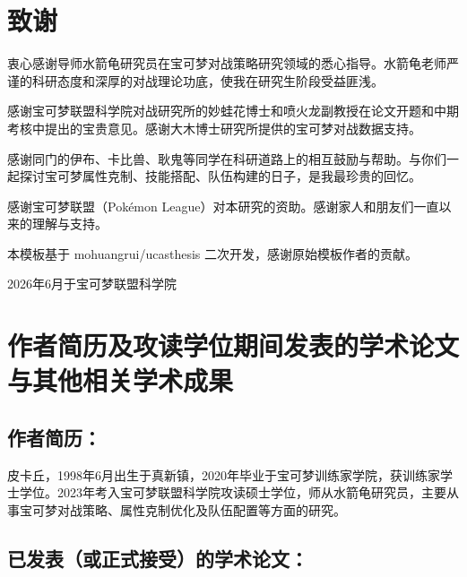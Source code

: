 \chapter[致谢]{致\quad 谢}

衷心感谢导师水箭龟研究员在宝可梦对战策略研究领域的悉心指导。水箭龟老师严谨的科研态度和深厚的对战理论功底，使我在研究生阶段受益匪浅。

感谢宝可梦联盟科学院对战研究所的妙蛙花博士和喷火龙副教授在论文开题和中期考核中提出的宝贵意见。感谢大木博士研究所提供的宝可梦对战数据支持。

感谢同门的伊布、卡比兽、耿鬼等同学在科研道路上的相互鼓励与帮助。与你们一起探讨宝可梦属性克制、技能搭配、队伍构建的日子，是我最珍贵的回忆。

感谢宝可梦联盟（Pokémon League）对本研究的资助。感谢家人和朋友们一直以来的理解与支持。

本模板基于 mohuangrui/ucasthesis 二次开发，感谢原始模板作者的贡献。

\vspace{2cm}
\begin{flushright}
2026年6月于宝可梦联盟科学院
\end{flushright}

\chapter[作者简历及攻读学位期间发表的学术论文与其他相关学术成果]{作者简历及攻读学位期间发表的学术论文与其他相关学术成果}


\section*{作者简历：}

皮卡丘，1998年6月出生于真新镇，2020年毕业于宝可梦训练家学院，获训练家学士学位。2023年考入宝可梦联盟科学院攻读硕士学位，师从水箭龟研究员，主要从事宝可梦对战策略、属性克制优化及队伍配置等方面的研究。

\section*{已发表（或正式接受）的学术论文：}


